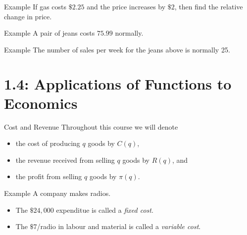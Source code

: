 \documentclass{beamer}
\theoremstyle{definition}
\begin{document}
\begin{frame}{Example}
  If gas costs $\$2.25$ and the price increases by $\$2$, then find the relative change in price.
\end{frame}

\begin{frame}{Example}
  A pair of jeans costs $75.99$ normally.
\end{frame}

\begin{frame}{Example}
  The number of sales per week for the jeans above is normally 25.
\end{frame}

\section{1.4: Applications of Functions to Economics}

\begin{frame}{Cost and Revenue}
  Throughout this course we will denote
  \begin{itemize}
    \item<2->
      the cost of producing $q$ goods by $C(q)$,
    \item<3->
      the revenue received from selling $q$ goods by $R(q)$, and
    \item<4->
      the profit from selling $q$ goods by $\pi(q)$.
  \end{itemize}
\end{frame}

\begin{frame}{Example}
  A company makes radios.
  \begin{itemize}
  \item<5->
    The $\$24,000$ expenditue is called a {\it fixed cost}.
  \item<6->
    The $\$7$/radio in labour and material is called a {\it variable cost}.
  \end{itemize}
\end{frame}
\end{document}
